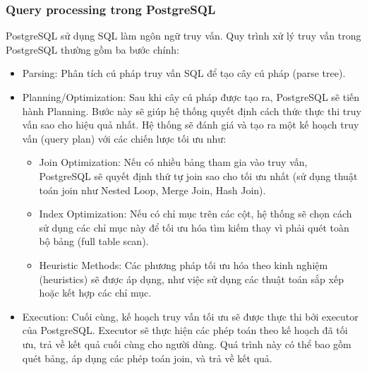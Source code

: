 \subsubsection{Query processing trong PostgreSQL}
\indent PostgreSQL sử dụng SQL làm ngôn ngữ truy vấn. Quy trình xử lý truy vấn trong PostgreSQL thường gồm ba bước chính:
\begin{itemize}
    \item Parsing: Phân tích cú pháp truy vấn SQL để tạo cây cú pháp (parse tree).
    \item Planning/Optimization: Sau khi cây cú pháp được tạo ra, PostgreSQL sẽ tiến hành Planning. Bước này sẽ giúp hệ thống quyết định cách thức thực thi truy vấn sao cho hiệu quả nhất. Hệ thống sẽ đánh giá và tạo ra một kế hoạch truy vấn (query plan) với các chiến lược tối ưu như:
        \begin{itemize}
            \item Join Optimization: Nếu có nhiều bảng tham gia vào truy vấn, PostgreSQL sẽ quyết định thứ tự join sao cho tối ưu nhất (sử dụng thuật toán join như Nested Loop, Merge Join, Hash Join).
            \item Index Optimization: Nếu có chỉ mục trên các cột, hệ thống sẽ chọn cách sử dụng các chỉ mục này để tối ưu hóa tìm kiếm thay vì phải quét toàn bộ bảng (full table scan).
            \item Heuristic Methods: Các phương pháp tối ưu hóa theo kinh nghiệm (heuristics) sẽ được áp dụng, như việc sử dụng các thuật toán sắp xếp hoặc kết hợp các chỉ mục.
        \end{itemize}
    \item Execution: Cuối cùng, kế hoạch truy vấn tối ưu sẽ được thực thi bởi executor của PostgreSQL. Executor sẽ thực hiện các phép toán theo kế hoạch đã tối ưu, trả về kết quả cuối cùng cho người dùng. Quá trình này có thể bao gồm quét bảng, áp dụng các phép toán join, và trả về kết quả.
\end{itemize}

